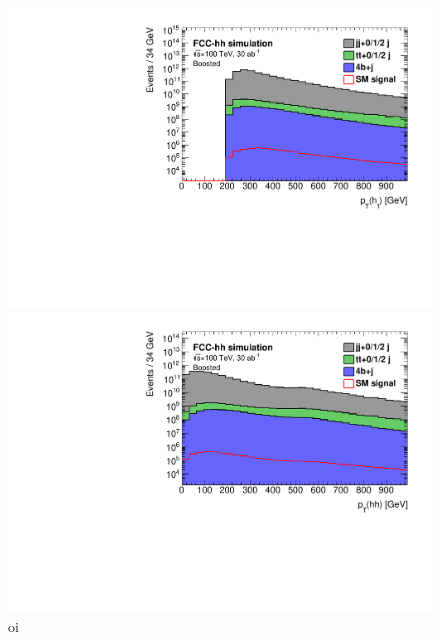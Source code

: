 \begin{figure}
	\centering
	\begin{minipage}{.5\textwidth}
		\centering
		\includegraphics[width=\linewidth]{./images/hist_h1_pt.pdf}
	\end{minipage}%
	\begin{minipage}{.5\textwidth}
		\centering
		\includegraphics[width=\linewidth]{./images/hist_hh_pt.pdf}
	\end{minipage}
	\caption{oi}
\end{figure}


